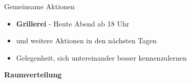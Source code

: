 \documentclass{../../presentation}
\begin{document}
\begin{frame}{Gemeinsame Aktionen}
  \begin{itemize}
    \item \textbf{Grillerei} - Heute Abend ab 18 Uhr
    \item und weitere Aktionen in den nächsten Tagen
    \item Gelegenheit, sich untereinander besser kennenzulernen
  \end{itemize}
\end{frame}

\begin{frame}[plain]
  \centering
  {\Huge\bfseries{Raumverteilung}}
\end{frame}
\end{document}
